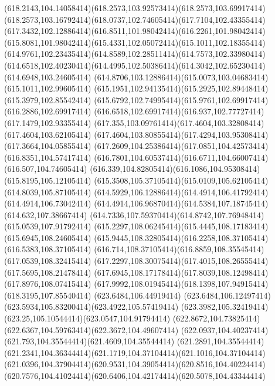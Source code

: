 {{	\curveto(618.2143,104.14058414)(618.2573,103.92573414)(618.2573,103.69917414)
	\curveto(618.2573,103.16792414)(618.0737,102.74605414)(617.7104,102.43355414)
	\curveto(617.3432,102.12886414)(616.8511,101.98042414)(616.2261,101.98042414)
	\curveto(615.8081,101.98042414)(615.4331,102.05072414)(615.1011,102.18355414)
	\curveto(614.9761,102.23435414)(614.8589,102.28511414)(614.7573,102.33980414)
	\curveto(614.6518,102.40230414)(614.4995,102.50386414)(614.3042,102.65230414)
	\lineto(614.6948,103.24605414)
	\curveto(614.8706,103.12886414)(615.0073,103.04683414)(615.1011,102.99605414)
	\curveto(615.1951,102.94135414)(615.2925,102.89448414)(615.3979,102.85542414)
	\curveto(615.6792,102.74995414)(615.9761,102.69917414)(616.2886,102.69917414)
	\curveto(616.6518,102.69917414)(616.937,102.77727414)(617.1479,102.93355414)
	\curveto(617.355,103.09761414)(617.4604,103.32808414)(617.4604,103.62105414)
	\curveto(617.4604,103.80855414)(617.4294,103.95308414)(617.3664,104.05855414)
	\curveto(617.2609,104.25386414)(617.0851,104.42573414)(616.8351,104.57417414)
	\curveto(616.7801,104.60537414)(616.6711,104.66007414)(616.507,104.74605414)
	\curveto(616.339,104.82805414)(616.1086,104.95308414)(615.8195,105.12105414)
	\curveto(615.3508,105.37105414)(615.0109,105.62105414)(614.8039,105.87105414)
	\curveto(614.5929,106.12886414)(614.4914,106.41792414)(614.4914,106.73042414)
	\curveto(614.4914,106.96870414)(614.5384,107.18745414)(614.632,107.38667414)
	\curveto(614.7336,107.59370414)(614.8742,107.76948414)(615.0539,107.91792414)
	\curveto(615.2297,108.06245414)(615.4445,108.17183414)(615.6945,108.24605414)
	\curveto(615.9445,108.32805414)(616.2258,108.37105414)(616.5383,108.37105414)
	\curveto(616.714,108.37105414)(616.8859,108.35545414)(617.0539,108.32415414)
	\curveto(617.2297,108.30075414)(617.4015,108.26555414)(617.5695,108.21478414)
	\curveto(617.6945,108.17178414)(617.8039,108.12498414)(617.8976,108.07415414)
	\curveto(617.9992,108.01945414)(618.1398,107.94915414)(618.3195,107.85540414)
	\closepath
	\moveto(623.6484,106.44919414)
	\curveto(623.6484,106.12497414)(623.5934,105.83200414)(623.4922,105.57419414)
	\curveto(623.3982,105.32419414)(623.25,105.10544414)(623.0547,104.91794414)
	\curveto(622.8672,104.73825414)(622.6367,104.59763414)(622.3672,104.49607414)
	\curveto(622.0937,104.40237414)(621.793,104.35544414)(621.4609,104.35544414)
	\lineto(621.2891,104.35544414)
	\curveto(621.2341,104.36344414)(621.1719,104.37104414)(621.1016,104.37104414)
	\curveto(621.0396,104.37904414)(620.9531,104.39054414)(620.8516,104.40224414)
	\curveto(620.7576,104.41024414)(620.6406,104.42174414)(620.5078,104.43344414)
}}
